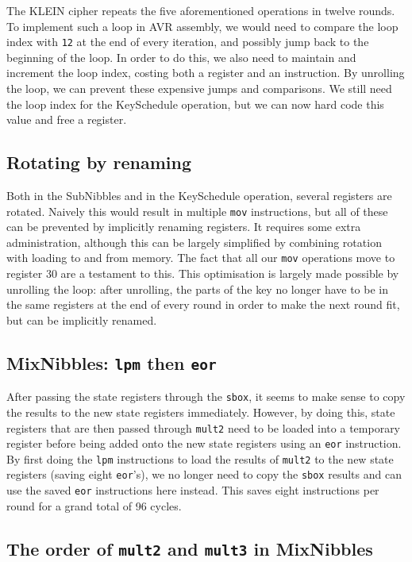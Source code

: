 \documentclass[a4paper]{article}
\begin{document}
The KLEIN cipher repeats the five aforementioned operations in twelve rounds. To implement such a loop in AVR assembly, we would need to compare the loop index with \texttt{12} at the end of every iteration, and possibly jump back to the beginning of the loop. In order to do this, we also need to maintain and increment the loop index, costing both a register and an instruction. By unrolling the loop, we can prevent these expensive jumps and comparisons. We still need the loop index for the KeySchedule operation, but we can now hard code this value and free a register.

\subsection*{Rotating by renaming}

Both in the SubNibbles and in the KeySchedule operation, several registers are rotated. Naively this would result in multiple \texttt{mov} instructions, but all of these can be prevented by implicitly renaming registers. It requires some extra administration, although this can be largely simplified by combining rotation with loading to and from memory. The fact that all our \texttt{mov} operations move to register 30 are a testament to this. This optimisation is largely made possible by unrolling the loop: after unrolling, the parts of the key no longer have to be in the same registers at the end of every round in order to make the next round fit, but can be implicitly renamed.

\hypertarget{lpmtheneor}{}
\subsection*{MixNibbles: \texttt{lpm} then \texttt{eor}}

After passing the state registers through the \texttt{sbox}, it seems to make sense to copy the results to the new state registers immediately. However, by doing this, state registers that are then passed through \texttt{mult2} need to be loaded into a temporary register before being added onto the new state registers using an \texttt{eor} instruction. By first doing the \texttt{lpm} instructions to load the results of \texttt{mult2} to the new state registers (saving eight \texttt{eor}'s), we no longer need to copy the \texttt{sbox} results and can use the saved \texttt{eor} instructions here instead. This saves eight instructions per round for a grand total of 96 cycles.

\subsection*{The order of \texttt{mult2} and \texttt{mult3} in MixNibbles}
\end{document}
